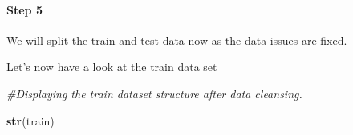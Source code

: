 \documentclass[]{article}
\newenvironment{Shaded}{\begin{snugshade}}{\end{snugshade}}
\newcommand{\KeywordTok}[1]{\textcolor[rgb]{0.13,0.29,0.53}{\textbf{#1}}}
\newcommand{\DecValTok}[1]{\textcolor[rgb]{0.00,0.00,0.81}{#1}}
\newcommand{\StringTok}[1]{\textcolor[rgb]{0.31,0.60,0.02}{#1}}
\newcommand{\CommentTok}[1]{\textcolor[rgb]{0.56,0.35,0.01}{\textit{#1}}}
\newcommand{\OperatorTok}[1]{\textcolor[rgb]{0.81,0.36,0.00}{\textbf{#1}}}
\newcommand{\NormalTok}[1]{#1}
\let\oldparagraph\paragraph
\renewcommand{\paragraph}[1]{\oldparagraph{#1}\mbox{}}
\begin{document}
\paragraph{Step 5}\label{step-5}

We will split the train and test data now as the data issues are fixed.

\begin{Shaded}
\end{Shaded}

Let's now have a look at the train data set

\begin{Shaded}
\begin{Highlighting}[]
\CommentTok{#Displaying the train dataset structure after data cleansing.}

\KeywordTok{str}\NormalTok{(train)}
\end{Highlighting}
\end{Shaded}
\end{document}
